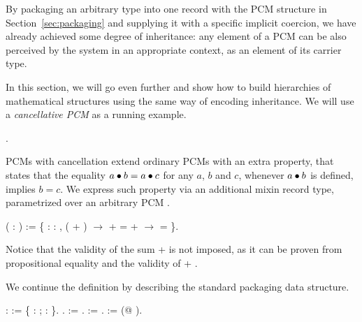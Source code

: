 

By packaging an arbitrary type  into one record with the PCM
structure in Section~\ref{sec:packaging} and supplying it with a
specific implicit coercion, we have already achieved some degree of
inheritance: any element of a PCM can be also perceived by the system
in an appropriate context, as an element of its carrier type. 


In this section, we will go even further and show how to build
hierarchies of mathematical structures using the same way of encoding
inheritance. We will use a \textit{cancellative PCM} as a running example.


\begin{coqdoccode}
\coqdocemptyline
\coqdocnoindent
{} .\coqdoceol
\coqdocemptyline
\end{coqdoccode}


PCMs with cancellation  extend ordinary PCMs
with an extra property, that states that the equality $a \bullet b = a
\bullet c$ for any $a$, $b$ and $c$, whenever $a \bullet b$ is defined,
implies $b = c$. We express such property via an additional mixin
record type, parametrized over an arbitrary PCM .


\begin{coqdoccode}
\coqdocemptyline
\coqdocnoindent
{}  ( : ) :=  \{\coqdoceol
\coqdocindent{1.00em}
\coqdocvar{\_} : \coqdockw{\ensuremath{\forall}}   : ,  ( + ) \ensuremath{\rightarrow}  +  =  +  \ensuremath{\rightarrow}  = \coqdoceol
\coqdocnoindent
\}.\coqdoceol
\coqdocemptyline
\end{coqdoccode}


Notice that the validity of the sum  +  is not imposed, as it can
be proven from propositional equality and the validity of  + .


We continue the definition by describing the standard packaging data
structure.


\begin{coqdoccode}
\coqdocemptyline
\coqdocnoindent
{}  :  :=  \{ : ; \coqdocvar{\_} :  \}.\coqdoceol
\coqdocemptyline
\coqdocnoindent
{} .\coqdoceol
\coqdocemptyline
\coqdocnoindent
{}  := .\coqdoceol
\coqdocnoindent
{}  := .\coqdoceol
\coqdocnoindent
{}   := (@  ).\coqdoceol
\coqdocemptyline
\end{coqdoccode}


